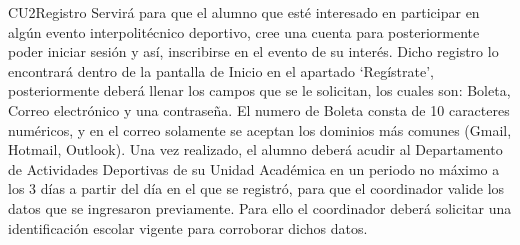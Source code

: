 \begin{UseCase}{CU2}{Registro}{
		Servirá para que el alumno que esté interesado en participar en algún evento interpolitécnico deportivo, cree una cuenta para posteriormente poder iniciar sesión y así, inscribirse en el evento de su interés. 
		Dicho registro lo encontrará dentro de la pantalla de Inicio en el apartado ‘Regístrate’, posteriormente deberá llenar los campos que se le solicitan, los cuales son: Boleta, Correo electrónico y una contraseña.
		El numero de Boleta consta de 10 caracteres numéricos, y en el correo solamente se aceptan los dominios más comunes (Gmail, Hotmail, Outlook).
		Una vez realizado, el alumno deberá acudir al Departamento de Actividades Deportivas de su Unidad Académica en un periodo no máximo a los 3 días a partir del día en el que se registró, para que el coordinador valide los datos que se ingresaron previamente. Para ello el coordinador deberá solicitar una identificación escolar vigente para corroborar dichos datos. }
	
\end{UseCase}
